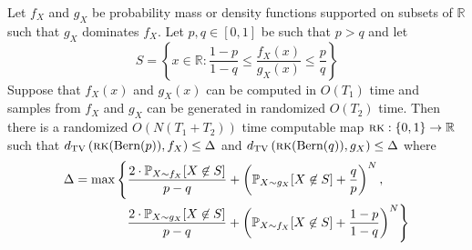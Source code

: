 \begin{lemma} \label{lem:5zz}
Let $f_X$ and $g_X$ be probability mass or density functions supported on subsets of $\mathbb{R}$ such that $g_X$ dominates $f_X$. Let $p, q \in [0, 1]$ be such that $p > q$ and let
$$S = \left\{ x \in \mathbb{R} : \frac{1 - p}{1 - q} \le \frac{f_X(x)}{g_X(x)} \le \frac{p}{q} \right\}$$
Suppose that $f_X(x)$ and $g_X(x)$ can be computed in $O(T_1)$ time and samples from $f_X$ and $g_X$ can be generated in randomized $O(T_2)$ time. Then there is a randomized $O(N(T_1 + T_2))$ time computable map $\textsc{rk} : \{0, 1\} \to \mathbb{R}$ such that $d_{\text{TV}}\left( \textsc{rk}(\text{Bern}(p)), f_X \right) \le \Delta$ and $d_{\text{TV}}\left( \textsc{rk}(\text{Bern}(q)), g_X \right) \le \Delta$ where
\begin{align*}
\Delta = \max &\left\{ \frac{2 \cdot \mathbb{P}_{X \sim f_X} [X \not \in S]}{p - q} + \left( \mathbb{P}_{X \sim g_X}[X \not \in S] + \frac{q}{p} \right)^{N}, \right. \\
&\, \, \, \, \left. \frac{2 \cdot \mathbb{P}_{X \sim g_X} [X \not \in S]}{p - q} + \left( \mathbb{P}_{X \sim f_X}[X \not \in S] + \frac{1 - p}{1 - q} \right)^{N} \right\}
\end{align*}
\end{lemma}

